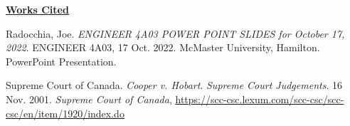 \documentclass[12pt,letterpaper]{article}
\begin{document}
\clearpage 
\noindent
\textbf{\underline{Works Cited}}

\begin{hangparas}{1em}{1}
Radocchia, Joe. \textit{ENGINEER 4A03 POWER POINT SLIDES for October 17, 2022}. ENGINEER 4A03, 17 Oct. 2022. McMaster University, Hamilton. PowerPoint Presentation.

Supreme Court of Canada. \textit{Cooper v. Hobart}. \textit{Supreme Court Judgements}. 16 Nov. 2001. \textit{Supreme Court of Canada}, \url{https://scc-csc.lexum.com/scc-csc/scc-csc/en/item/1920/index.do}
\end{hangparas}
\end{document}
